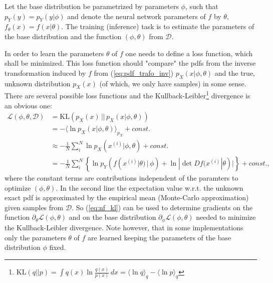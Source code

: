 \documentclass[12pt,a4paper]{article}
\begin{document}
Let the base distribution be parametrized by parameters $\phi$, such that $p_Y(y) = p_Y(y|\phi)$ and denote the neural network parameters of $f$ by $\theta$, $f_\theta(x) = f(x|\theta)$. The training (inference) task is to estimate the parameters of the base distribution and the function $(\phi,\theta)$ from $\mathcal D$. 

In order to learn the parameters $\theta$ of $f$ one needs to define a loss function, which shall be minimized. This loss function should "compare" the pdfs from the inverse transformation induced by $f$ from (\ref{eq:pdf_trafo_inv}) $p_X(x|\phi, \theta)$ and the true, unknown distribution $p_X(x)$  (of which, we only have samples) in some sense. There are several possible loss functions and the Kullback-Leibler\footnote{$\text{KL}(q||p) = \int q(x) \ln \frac{q(x)}{p(x)} \, dx=  \langle \ln q \rangle_q - \langle \ln p \rangle_q$} divergence is an obvious one:
\begin{align}
\mathcal L (\phi, \theta, \mathcal D) &= \text{KL}(p_X(x) \, || \, p_X(x | \phi, \theta)) \nonumber \\ 
&=  -  \langle \ln p_X(x | \phi, \theta) \rangle _{p_X} + const. \nonumber \\ 
& \approx - \frac{1}{N}\sum_i^N \ln p_X(x^{(i)} | \phi, \theta) + const.  \nonumber \\ 
& = - \frac{1}{N}\sum_i ^N \left\{ \ln p_Y(f(x^{(i)} | \theta)\, |\, \phi) + \ln |\det Df(x^{(i)}|\theta)|  \right\}+ const., \label{eq:nf_kl}
\end{align}
where the constant terms are contributions independent of the paramters to optimize $(\phi, \theta)$. In the second line the expectation value w.r.t. the unknown exact pdf is approximated by the empirical mean (Monte-Carlo approximation) given samples from $\mathcal D$. So (\ref{eq:nf_kl}) can be used to determine gradients on the function $\partial_\theta \mathcal L (\phi, \theta)$ and on the base distribution $\partial_\phi \mathcal L (\phi, \theta)$ needed to minimize the Kullback-Leibler divergence. Note however, that in some implementations only the parameters $\theta$ of $f$ are learned keeping the parameters of the  base distribution $\phi$ fixed.
\end{document}
